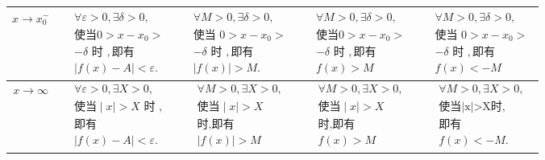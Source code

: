 \documentclass[8pt a4paper, oneside, UTF8]{ctexbook}
\begin{document}
\begin{sloppypar}
\begin{center}
\begin{tabular}{|c|c|c|c|c|}
            $x \to x_0^-$     & $\begin{aligned}&\forall\varepsilon>0,\exists\delta>0, \\&\text{使当}0>x-x_{0}> \\&-\delta\text{ 时 },\text{即有} \\&|f(x)-A|<\varepsilon.\end{aligned}$         & $\begin{aligned}&\forall M>0,\exists\delta>0, \\&\text{使当 }0>x-x_{0}> \\&-\delta\text{ 时 },\text{即有} \\&|f(x)|>M.\end{aligned}$         & $\begin{aligned}&\forall M>0,\exists\delta>0, \\&\text{使当}0>x-x_{0}> \\&-\delta\text{ 时 },\text{即有}\\& f(x) >M\end{aligned}$ & $\begin{aligned}&\forall M>0,\exists\delta>0, \\&\text{使当 }0>x-x_{0}> \\&-\delta\text{ 时 },\text{即有}\\&f(x) <-M\end{aligned}$    \\ \hline
            $x\to \infty$     & $\begin{aligned}&\forall\varepsilon>0,\exists X>0, \\&\text{使当}\mid x\mid>X\text{ 时 }, \\&\text{即有} \\&|f(x)-A|<\varepsilon.\end{aligned}$                  & $\begin{aligned}&\forall M>0,\exists X>0,\\& \text{使当}\mid x\mid>X \\&\text{时,即有}\\&|f(x)|>M\end{aligned}$                              & $\begin{aligned}&\forall M>0,\exists X>0, \\&\text{使当}\mid x\mid>X \\&\text{时,即有}\\& f(x)>M\end{aligned}$                    & $\begin{aligned}&\forall M>0,\exists X>0, \\&\text{使当|x|>X时,} \\&\text{即有} \\&f(x)<-M.\end{aligned}$                             \\ \hline

\end{tabular}
\end{center}
\end{sloppypar}
\end{document}
